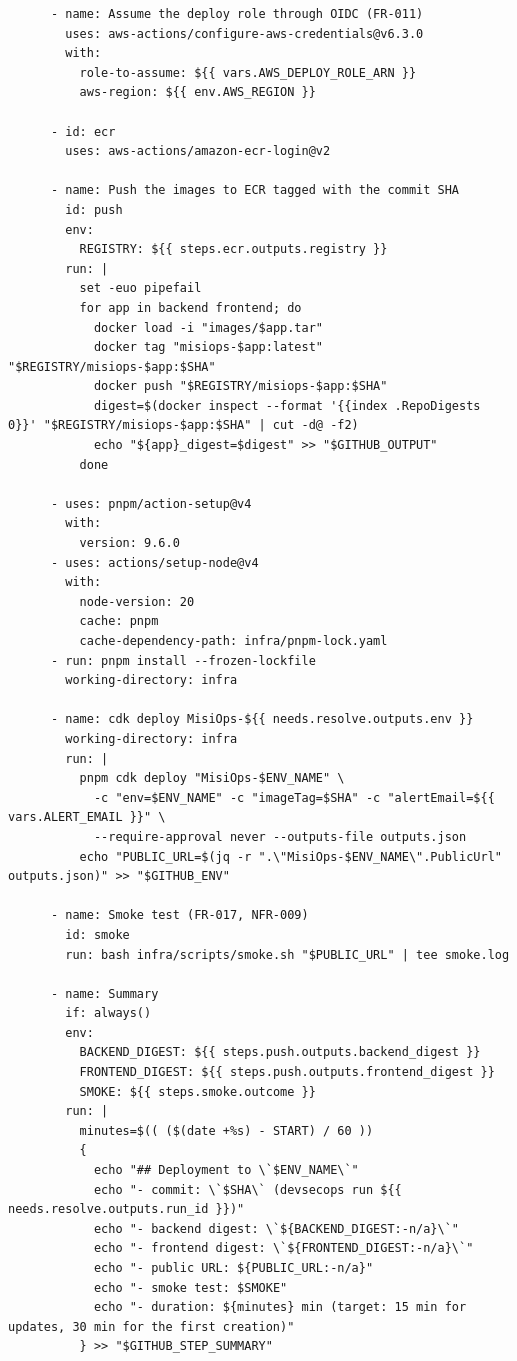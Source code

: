 \begin{lstlisting}
      - name: Assume the deploy role through OIDC (FR-011)
        uses: aws-actions/configure-aws-credentials@v6.3.0
        with:
          role-to-assume: ${{ vars.AWS_DEPLOY_ROLE_ARN }}
          aws-region: ${{ env.AWS_REGION }}

      - id: ecr
        uses: aws-actions/amazon-ecr-login@v2

      - name: Push the images to ECR tagged with the commit SHA
        id: push
        env:
          REGISTRY: ${{ steps.ecr.outputs.registry }}
        run: |
          set -euo pipefail
          for app in backend frontend; do
            docker load -i "images/$app.tar"
            docker tag "misiops-$app:latest" "$REGISTRY/misiops-$app:$SHA"
            docker push "$REGISTRY/misiops-$app:$SHA"
            digest=$(docker inspect --format '{{index .RepoDigests 0}}' "$REGISTRY/misiops-$app:$SHA" | cut -d@ -f2)
            echo "${app}_digest=$digest" >> "$GITHUB_OUTPUT"
          done

      - uses: pnpm/action-setup@v4
        with:
          version: 9.6.0
      - uses: actions/setup-node@v4
        with:
          node-version: 20
          cache: pnpm
          cache-dependency-path: infra/pnpm-lock.yaml
      - run: pnpm install --frozen-lockfile
        working-directory: infra

      - name: cdk deploy MisiOps-${{ needs.resolve.outputs.env }}
        working-directory: infra
        run: |
          pnpm cdk deploy "MisiOps-$ENV_NAME" \
            -c "env=$ENV_NAME" -c "imageTag=$SHA" -c "alertEmail=${{ vars.ALERT_EMAIL }}" \
            --require-approval never --outputs-file outputs.json
          echo "PUBLIC_URL=$(jq -r ".\"MisiOps-$ENV_NAME\".PublicUrl" outputs.json)" >> "$GITHUB_ENV"

      - name: Smoke test (FR-017, NFR-009)
        id: smoke
        run: bash infra/scripts/smoke.sh "$PUBLIC_URL" | tee smoke.log

      - name: Summary
        if: always()
        env:
          BACKEND_DIGEST: ${{ steps.push.outputs.backend_digest }}
          FRONTEND_DIGEST: ${{ steps.push.outputs.frontend_digest }}
          SMOKE: ${{ steps.smoke.outcome }}
        run: |
          minutes=$(( ($(date +%s) - START) / 60 ))
          {
            echo "## Deployment to \`$ENV_NAME\`"
            echo "- commit: \`$SHA\` (devsecops run ${{ needs.resolve.outputs.run_id }})"
            echo "- backend digest: \`${BACKEND_DIGEST:-n/a}\`"
            echo "- frontend digest: \`${FRONTEND_DIGEST:-n/a}\`"
            echo "- public URL: ${PUBLIC_URL:-n/a}"
            echo "- smoke test: $SMOKE"
            echo "- duration: ${minutes} min (target: 15 min for updates, 30 min for the first creation)"
          } >> "$GITHUB_STEP_SUMMARY"
\end{lstlisting}

